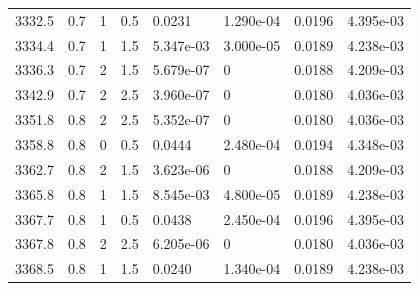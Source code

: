 \documentclass[preview]{standalone}
\begin{document}
{{{{{{{{{{{{\begin{tabular}{L{1.2cm}C{1.2cm} C{0.3cm}C{0.5cm} C{1.4cm}C{1.4cm} C{1.4cm}C{1.4cm}}
  3332.5  &   0.7  & 1     & 0.5 &  0.0231  & 1.290e-04  & 0.0196 &  4.395e-03   \\ 
  3334.4  &   0.7  & 1     & 1.5 &  5.347e-03  & 3.000e-05  & 0.0189 &  4.238e-03   \\ 
  3336.3  &   0.7  & 2     & 1.5 &  5.679e-07  & 0  & 0.0188 &  4.209e-03   \\ 
  3342.9  &   0.7  & 2     & 2.5 &  3.960e-07  & 0  & 0.0180 &  4.036e-03   \\ 
  3351.8  &   0.8  & 2     & 2.5 &  5.352e-07  & 0  & 0.0180 &  4.036e-03   \\ 
  3358.8  &   0.8  & 0     & 0.5 &  0.0444  & 2.480e-04  & 0.0194 &  4.348e-03   \\ 
  3362.7  &   0.8  & 2     & 1.5 &  3.623e-06  & 0  & 0.0188 &  4.209e-03   \\ 
  3365.8  &   0.8  & 1     & 1.5 &  8.545e-03  & 4.800e-05  & 0.0189 &  4.238e-03   \\ 
  3367.7  &   0.8  & 1     & 0.5 &  0.0438  & 2.450e-04  & 0.0196 &  4.395e-03   \\ 
  3367.8  &   0.8  & 2     & 2.5 &  6.205e-06  & 0  & 0.0180 &  4.036e-03   \\ 
  3368.5  &   0.8  & 1     & 1.5 &  0.0240  & 1.340e-04  & 0.0189 &  4.238e-03   \\ 
\hline 
\end{tabular} 

}}}}}}}}}}}}
\end{document}
